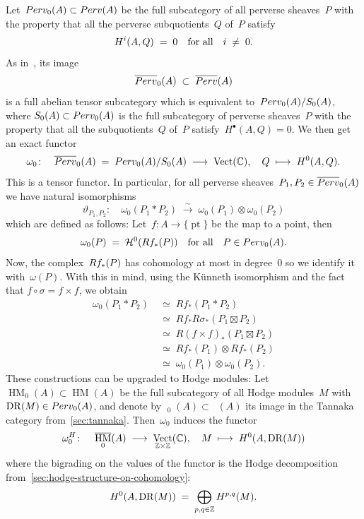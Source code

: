 \documentclass[a4paper]{amsart}
\newcommand{\bbC}{\mathbb{C}}
\newcommand{\bbZ}{\mathbb{Z}}
\newcommand{\cH}{\mathcal{H}}
\newcommand{\rH}{\textup{H}}
\newcommand{\rR}{\textup{R}}
\newcommand{\rS}{\textup{S}}
\newcommand{\too}{\longrightarrow}
\newcommand{\iso}{\simeq}
\newcommand{\Perv}{\textup{Perv}}
\newcommand{\Pbar}{\overline{\Perv}}
\DeclareMathOperator{\Vect}{Vect}
\DeclareMathOperator{\pt}{pt}
\DeclareMathOperator{\DR}{DR}
\DeclareMathOperator{\HM}{HM}
\DeclareMathOperator{\Mbar}{\overline{\HM}}
\theoremstyle{plain}
\theoremstyle{definition}
\numberwithin{equation}{section}
\begin{document}
Let~$\Perv_0(A) \subset \Perv(A)$ be the full subcategory of all perverse sheaves~$P$ with the property that all the perverse subquotients~$Q$ of~$P$ satisfy 
%
\[
 \rH^i(A, Q) \;=\; 0 \quad \text{for all} \quad i\;\neq\; 0.
\]
%
As in~\cite[sect.~4.3]{JKLM}, its image
%
\[
\Pbar_0(A) \;\subset\; \Pbar(A)
\]
%
is a full abelian tensor subcategory which is equivalent to~$\Perv_0(A)/S_0(A)$, where $\rS_0(A) \subset \Perv_0(A)$ is the full subcategory  of perverse sheaves~$P$ with the property that all the subquotients~$Q$ of~$P$ satisfy~$H^\bullet(A, Q)=0$. We then get an exact functor
%
\[
 \omega_0\colon \quad \Pbar_0(A) \;=\; \Perv_0(A)/S_0(A)\;\too\; \Vect(\bbC), \quad Q \;\longmapsto\; H^0(A, Q).
\]
%
This is a tensor functor. In particular, for all perverse sheaves~$P_1, P_2\in \Pbar_0(A)$ we have natural isomorphisms
%
\[
 \vartheta_{P_1, P_2}\colon \quad \omega_0(P_1*P_2) \;\stackrel{\sim}{\longrightarrow}\;  \omega_0(P_1) \otimes \omega_0(P_2)
\] 
%
which are defined as follows: Let~$f\colon A \to \{\pt \}$ be the map to a point, then
%
\[ \omega_0(P) \;=\; \cH^0(\rR f_*(P)) \quad \text{for all} \quad P\in \Perv_0(A). \]
%
Now, the complex~$\rR f_\ast (P)$ has cohomology at most in degree~$0$ so we identify it with~$\omega(P)$. With this in mind, using the K\"unneth isomorphism and the fact that $f\circ \sigma = f\times f$, we obtain
%
\begin{align*} 
 \omega_0(P_1 * P_2) 
 &\;\iso\; Rf_* (P_1 * P_2) 
 \\
 &\;\simeq\; Rf_* R\sigma_* (P_1\boxtimes P_2) 
 \\
 &\;\simeq\; R(f\times f)_* (P_1\boxtimes P_2)
 \\
 &\;\simeq\; Rf_*(P_1)\otimes Rf_*(P_2)
 \\
 &\;\iso\; \omega_0(P_1) \otimes \omega_0(P_2). 
\end{align*} 
%
These constructions can be upgraded to Hodge modules: Let~$\HM_0(A)\subset \HM(A)$ be the full subcategory of all Hodge modules~$M$ with~$\DR(M)\in \Perv_0(A)$, and denote by $\Mbar_0(A)\subset \Mbar(A)$ its image in the Tannaka category from~\cref{sec:tannaka}. Then~$\omega_0$ induces the functor
%
\[
 \omega_0^H\colon \quad \Mbar_0(A) \;\longrightarrow\; \Vect_{\bbZ \times \bbZ}(\bbC), \quad M\;\longmapsto\; \rH^0(A, \DR(M))
\]
%
where the bigrading on the values of the functor is the Hodge decomposition from~\cref{sec:hodge-structure-on-cohomology}:
%
\[
\rH^0(A, \DR(M)) \;=\; \bigoplus_{p,q\in \bbZ} \rH^{p,q}(M).
\]
%
\end{document}
